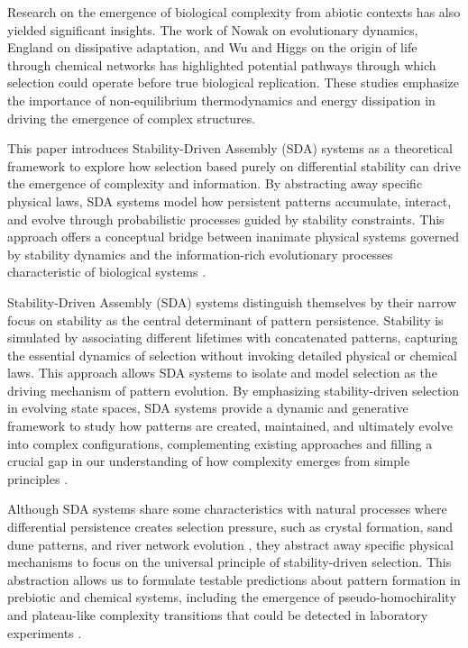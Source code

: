 \documentclass[preprint,12pt]{elsarticle}
\begin{document}
Research on the emergence of biological complexity from abiotic contexts has also yielded significant insights. The work of Nowak \cite{nowak2006evolutionary} on evolutionary dynamics, England \cite{england2015dissipative} on dissipative adaptation, and Wu and Higgs \cite{wu2012origin} on the origin of life through chemical networks has highlighted potential pathways through which selection could operate before true biological replication. These studies emphasize the importance of non-equilibrium thermodynamics \cite{prigogine1977self, nicolis1977self} and energy dissipation in driving the emergence of complex structures.

This paper introduces Stability-Driven Assembly (SDA) systems as a theoretical framework to explore how selection based purely on differential stability can drive the emergence of complexity and information. By abstracting away specific physical laws, SDA systems model how persistent patterns accumulate, interact, and evolve through probabilistic processes guided by stability constraints. This approach offers a conceptual bridge between inanimate physical systems governed by stability dynamics and the information-rich evolutionary processes characteristic of biological systems \cite{noble2012causality, ellis2012top}.

Stability-Driven Assembly (SDA) systems distinguish themselves by their narrow focus on stability as the central determinant of pattern persistence. Stability is simulated by associating different lifetimes with concatenated patterns, capturing the essential dynamics of selection without invoking detailed physical or chemical laws. This approach allows SDA systems to isolate and model selection as the driving mechanism of pattern evolution. By emphasizing stability-driven selection in evolving state spaces, SDA systems provide a dynamic and generative framework to study how patterns are created, maintained, and ultimately evolve into complex configurations, complementing existing approaches and filling a crucial gap in our understanding of how complexity emerges from simple principles \cite{lloyd2006programming, wolfram2020fundamental}.

Although SDA systems share some characteristics with natural processes where differential persistence creates selection pressure, such as crystal formation, sand dune patterns, and river network evolution \cite{ball1999self, kelso1997dynamic}, they abstract away specific physical mechanisms to focus on the universal principle of stability-driven selection. This abstraction allows us to formulate testable predictions about pattern formation in prebiotic and chemical systems, including the emergence of pseudo-homochirality and plateau-like complexity transitions that could be detected in laboratory experiments \cite{blackmond2010chiral, tononi2008phi}.
\end{document}
